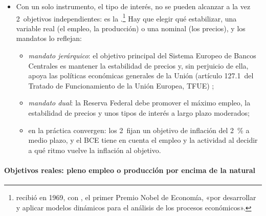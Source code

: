\documentclass[11pt]{article}
\begin{document}
\begin{itemize}
\item Con un solo instrumento, el tipo de interés, no se pueden alcanzar a la vez 2~objetivos independientes: es la \nocite{Tinbergen1952Theory}.\footnote{ recibió en 1969, con , el primer Premio Nobel de Economía, «por desarrollar y aplicar modelos dinámicos para el análisis de los procesos económicos»\nocite{Nobel1969}.} Hay que elegir qué estabilizar, una variable real (el empleo, la producción) o una nominal (los precios), y los mandatos lo reflejan:
  \begin{itemize}
  \item \emph{mandato jerárquico}: el objetivo principal del Sistema Europeo de Bancos Centrales es mantener la estabilidad de precios y, sin perjuicio de ella, apoya las políticas económicas generales de la Unión (artículo 127.1~del Tratado de Funcionamiento de la Unión Europea, TFUE) ;
  \item \emph{mandato dual}: la Reserva Federal debe promover el máximo empleo, la estabilidad de precios y unos tipos de interés a largo plazo moderados\nocite{Fed2026Mandato};
  \item en la práctica convergen: los 2~fijan un objetivo de inflación del 2~\% a medio plazo, y el BCE tiene en cuenta el empleo y la actividad al decidir a qué ritmo vuelve la inflación al objetivo\nocite{BCE2021Estrategia}.
  \end{itemize}
\end{itemize}

\paragraph{Objetivos reales: pleno empleo o producción por encima de la natural}
\end{document}
